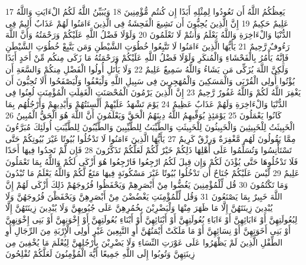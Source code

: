 \documentclass[20pt,a4paper]{article}
\begin{document}
{\tiny\colorbox{cl_aya}{17}} يَعِظُكُمُ اللَّهُ أَن تَعُودُوا لِمِثْلِهِ أَبَدًا إِن كُنتُم مُّؤْمِنِينَ
{\tiny\colorbox{cl_aya}{18}} وَيُبَيِّنُ اللَّهُ لَكُمُ الْءَايَتِ وَاللَّهُ عَلِيمٌ حَكِيمٌ
{\tiny\colorbox{cl_aya}{19}} إِنَّ الَّذِينَ يُحِبُّونَ أَن تَشِيعَ الْفَحِشَةُ فِى الَّذِينَ ءَامَنُوا لَهُمْ عَذَابٌ أَلِيمٌ فِى الدُّنْيَا وَالْءَاخِرَةِ وَاللَّهُ يَعْلَمُ وَأَنتُمْ لَا تَعْلَمُونَ
{\tiny\colorbox{cl_aya}{20}} وَلَوْلَا فَضْلُ اللَّهِ عَلَيْكُمْ وَرَحْمَتُهُ وَأَنَّ اللَّهَ رَءُوفٌ رَّحِيمٌ
{\tiny\colorbox{cl_aya}{21}} يَأَيُّهَا الَّذِينَ ءَامَنُوا لَا تَتَّبِعُوا خُطُوَتِ الشَّيْطَنِ وَمَن يَتَّبِعْ خُطُوَتِ الشَّيْطَنِ فَإِنَّهُ يَأْمُرُ بِالْفَحْشَاءِ وَالْمُنكَرِ وَلَوْلَا فَضْلُ اللَّهِ عَلَيْكُمْ وَرَحْمَتُهُ مَا زَكَى مِنكُم مِّنْ أَحَدٍ أَبَدًا وَلَكِنَّ اللَّهَ يُزَكِّى مَن يَشَاءُ وَاللَّهُ سَمِيعٌ عَلِيمٌ
{\tiny\colorbox{cl_aya}{22}} وَلَا يَأْتَلِ أُولُوا الْفَضْلِ مِنكُمْ وَالسَّعَةِ أَن يُؤْتُوا أُولِى الْقُرْبَى وَالْمَسَكِينَ وَالْمُهَجِرِينَ فِى سَبِيلِ اللَّهِ وَلْيَعْفُوا وَلْيَصْفَحُوا أَلَا تُحِبُّونَ أَن يَغْفِرَ اللَّهُ لَكُمْ وَاللَّهُ غَفُورٌ رَّحِيمٌ
{\tiny\colorbox{cl_aya}{23}} إِنَّ الَّذِينَ يَرْمُونَ الْمُحْصَنَتِ الْغَفِلَتِ الْمُؤْمِنَتِ لُعِنُوا فِى الدُّنْيَا وَالْءَاخِرَةِ وَلَهُمْ عَذَابٌ عَظِيمٌ
{\tiny\colorbox{cl_aya}{24}} يَوْمَ تَشْهَدُ عَلَيْهِمْ أَلْسِنَتُهُمْ وَأَيْدِيهِمْ وَأَرْجُلُهُم بِمَا كَانُوا يَعْمَلُونَ
{\tiny\colorbox{cl_aya}{25}} يَوْمَئِذٍ يُوَفِّيهِمُ اللَّهُ دِينَهُمُ الْحَقَّ وَيَعْلَمُونَ أَنَّ اللَّهَ هُوَ الْحَقُّ الْمُبِينُ
{\tiny\colorbox{cl_aya}{26}} الْخَبِيثَتُ لِلْخَبِيثِينَ وَالْخَبِيثُونَ لِلْخَبِيثَتِ وَالطَّيِّبَتُ لِلطَّيِّبِينَ وَالطَّيِّبُونَ لِلطَّيِّبَتِ أُولَئِكَ مُبَرَّءُونَ مِمَّا يَقُولُونَ لَهُم مَّغْفِرَةٌ وَرِزْقٌ كَرِيمٌ
{\tiny\colorbox{cl_aya}{27}} يَأَيُّهَا الَّذِينَ ءَامَنُوا لَا تَدْخُلُوا بُيُوتًا غَيْرَ بُيُوتِكُمْ حَتَّى تَسْتَأْنِسُوا وَتُسَلِّمُوا عَلَى أَهْلِهَا ذَلِكُمْ خَيْرٌ لَّكُمْ لَعَلَّكُمْ تَذَكَّرُونَ
{\tiny\colorbox{cl_aya}{28}} فَإِن لَّمْ تَجِدُوا فِيهَا أَحَدًا فَلَا تَدْخُلُوهَا حَتَّى يُؤْذَنَ لَكُمْ وَإِن قِيلَ لَكُمُ ارْجِعُوا فَارْجِعُوا هُوَ أَزْكَى لَكُمْ وَاللَّهُ بِمَا تَعْمَلُونَ عَلِيمٌ
{\tiny\colorbox{cl_aya}{29}} لَّيْسَ عَلَيْكُمْ جُنَاحٌ أَن تَدْخُلُوا بُيُوتًا غَيْرَ مَسْكُونَةٍ فِيهَا مَتَعٌ لَّكُمْ وَاللَّهُ يَعْلَمُ مَا تُبْدُونَ وَمَا تَكْتُمُونَ
{\tiny\colorbox{cl_aya}{30}} قُل لِّلْمُؤْمِنِينَ يَغُضُّوا مِنْ أَبْصَرِهِمْ وَيَحْفَظُوا فُرُوجَهُمْ ذَلِكَ أَزْكَى لَهُمْ إِنَّ اللَّهَ خَبِيرٌ بِمَا يَصْنَعُونَ
{\tiny\colorbox{cl_aya}{31}} وَقُل لِّلْمُؤْمِنَتِ يَغْضُضْنَ مِنْ أَبْصَرِهِنَّ وَيَحْفَظْنَ فُرُوجَهُنَّ وَلَا يُبْدِينَ زِينَتَهُنَّ إِلَّا مَا ظَهَرَ مِنْهَا وَلْيَضْرِبْنَ بِخُمُرِهِنَّ عَلَى جُيُوبِهِنَّ وَلَا يُبْدِينَ زِينَتَهُنَّ إِلَّا لِبُعُولَتِهِنَّ أَوْ ءَابَائِهِنَّ أَوْ ءَابَاءِ بُعُولَتِهِنَّ أَوْ أَبْنَائِهِنَّ أَوْ أَبْنَاءِ بُعُولَتِهِنَّ أَوْ إِخْوَنِهِنَّ أَوْ بَنِى إِخْوَنِهِنَّ أَوْ بَنِى أَخَوَتِهِنَّ أَوْ نِسَائِهِنَّ أَوْ مَا مَلَكَتْ أَيْمَنُهُنَّ أَوِ التَّبِعِينَ غَيْرِ أُولِى الْإِرْبَةِ مِنَ الرِّجَالِ أَوِ الطِّفْلِ الَّذِينَ لَمْ يَظْهَرُوا عَلَى عَوْرَتِ النِّسَاءِ وَلَا يَضْرِبْنَ بِأَرْجُلِهِنَّ لِيُعْلَمَ مَا يُخْفِينَ مِن زِينَتِهِنَّ وَتُوبُوا إِلَى اللَّهِ جَمِيعًا أَيُّهَ الْمُؤْمِنُونَ لَعَلَّكُمْ تُفْلِحُونَ
\end{document}
